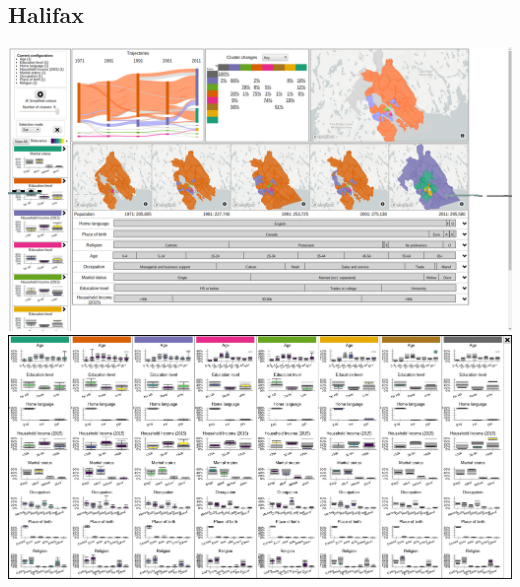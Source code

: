 \documentclass[a4paper]{article}
\begin{document}
\subsection{Halifax}
\begin{center}
	\includegraphics[width=\linewidth]{3a.png}
	\includegraphics[width=\linewidth]{3b.png}
\end{center}
\end{document}
